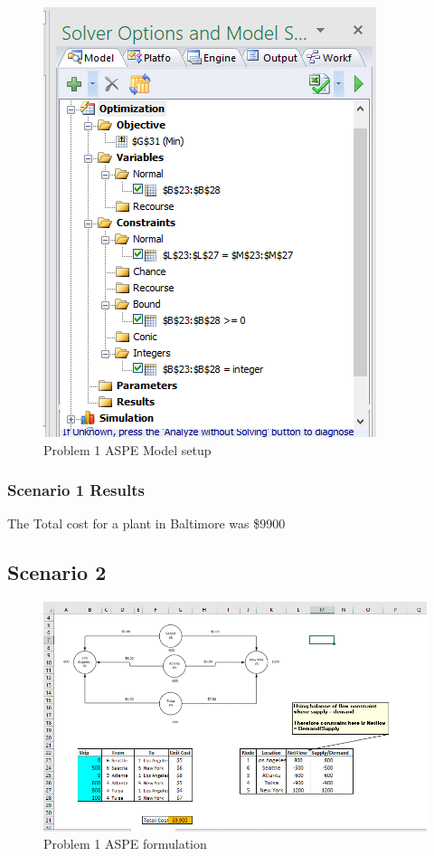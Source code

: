\documentclass[]{article}
\begin{document}
\begin{figure}
\centering
\includegraphics[height=0.50000\textwidth]{Figures/Homework3/modelp1a.PNG}
\caption{Problem 1 ASPE Model setup}
\end{figure}

\subsubsection{Scenario 1 Results}\label{scenario-1-results}

The Total cost for a plant in Baltimore was \$9900

\subsection{Scenario 2}\label{scenario-2}

\begin{figure}
\centering
\includegraphics[height=0.50000\textwidth]{Figures/Homework3/p1b.PNG}
\caption{Problem 1 ASPE formulation}
\end{figure}
\end{document}
